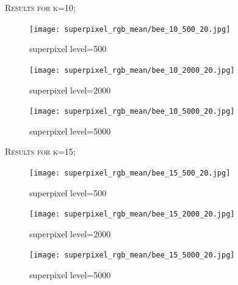 \documentclass[12pt]{article}
\begin{document}
\begin{minipage}{\linewidth}
\centering
	\textsc{\large Results for k=10;}\\[0.1 cm]  
	\begin{minipage}{0.45\linewidth}
		\begin{figure} [H]
			\centering
			 \texttt{[image: superpixel\_rgb\_mean/bee\_10\_500\_20.jpg]}
	 		\caption{superpixel level=500}
		\end{figure}
	\end{minipage}
	\hspace{0.05\linewidth}
	\begin{minipage}{0.45\linewidth}
			\begin{figure} [H]
				\centering
				 \texttt{[image: superpixel\_rgb\_mean/bee\_10\_2000\_20.jpg]}
	 			\caption{superpixel level=2000}
			\end{figure}
	\end{minipage}
	\hspace{0.05\linewidth}
	\begin{minipage}{0.45\linewidth}
		\begin{figure} [H]
			\centering
			 \texttt{[image: superpixel\_rgb\_mean/bee\_10\_5000\_20.jpg]}
	 		\caption{superpixel level=5000}
		\end{figure}
	\end{minipage}
\end{minipage}

\begin{minipage}{\linewidth}
\centering
	\textsc{\large Results for k=15;}\\[0.1 cm]  
	\begin{minipage}{0.45\linewidth}
		\begin{figure} [H]
			\centering
			 \texttt{[image: superpixel\_rgb\_mean/bee\_15\_500\_20.jpg]}
	 		\caption{superpixel level=500}
		\end{figure}
	\end{minipage}
	\hspace{0.05\linewidth}
	\begin{minipage}{0.45\linewidth}
			\begin{figure} [H]
				\centering
				 \texttt{[image: superpixel\_rgb\_mean/bee\_15\_2000\_20.jpg]}
	 			\caption{superpixel level=2000}
			\end{figure}
	\end{minipage}
	\hspace{0.05\linewidth}
	\begin{minipage}{0.45\linewidth}
		\begin{figure} [H]
			\centering
			 \texttt{[image: superpixel\_rgb\_mean/bee\_15\_5000\_20.jpg]}
	 		\caption{superpixel level=5000}
		\end{figure}
	\end{minipage}
\end{minipage}
\end{document}
